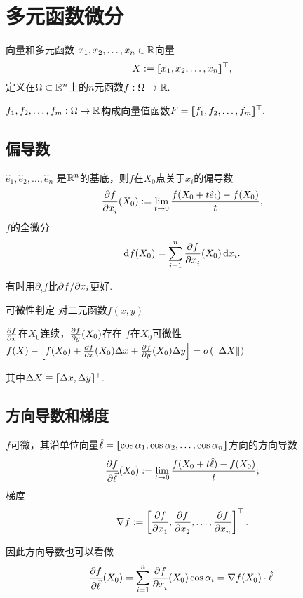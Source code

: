 \def\coursename{微积分}
\def\coursefullname{多元微积分与级数}
\def\courseEnglishname{Multivariate Calculus and Series}
\def\teachername{姚家燕}
\def\beginday{2021/3/31}





\firstandforemost

\section{多元函数微分}
\begin{definition}{向量和多元函数}{}
	$x_1,x_2,\ldots,x_n\in\mathbb R$向量
	\[
		X:=\lfloor\hspace{-4.7 pt}\lceil x_1,x_2,\ldots,x_n\rceil\hspace{-4.7 pt}\rfloor^\top,
	\]
	定义在$\Omega\subset\mathbb R^n$上的$n$元函数$f:\Omega\to\mathbb R.$
\end{definition}
$f_1,f_2,\ldots,f_m:\Omega\to\mathbb R$构成向量值函数$F=\lfloor\hspace{-4.7 pt}\lceil f_1,f_2,\ldots,f_m\rceil\hspace{-4.7 pt}\rfloor^\top.$
\subsection{偏导数}
\begin{definition}{}{}
	$\hat e_1,\hat e_2,\ldots,\hat e_n$ 是$\mathbb R^n$的基底，则$f$在$X_0$点关于$x_i$的偏导数
	\[
		\frac{\partial^{\;\!\!}f}{\partial x_i^{\;\!\!}}(X_0):=\lim_{t\to 0}\frac{f(X_0+t\hat e_i)-f(X_0)}t,
	\]
	$f$的全微分
	\begin{align}
		\mathop{}\!\mathrm{d} f(X_0)=\sum_{i=1}^n\frac{\partial^{\;\!\!}f}{\partial x_i^{\;\!\!}}(X_0)\mathop{}\!\mathrm{d} x_i.
	\end{align}
\end{definition}
有时用$\partial_if$比$\partial f/\partial x_i$更好.
\begin{theorem}{可微性判定}{}
	对二元函数$f(x,y)$
	\begin{center}
		$\frac{\partial^{\;\!\!}f}{\partial x^{\;\!\!}}$在$X_0$连续，$\frac{\partial^{\;\!\!}f}{\partial y^{\;\!\!}}(X_0)$存在
		\vthus
		$f$在$X_0$可微性
		\viff
		$f(X)-\fkh{f(X_0)+\pv fx(X_0)\Delta x+\pv fy(X_0)\Delta y}=o\kh{\norm{\Delta X}}$
	\end{center}
	其中$\Delta X\equiv\lfloor\hspace{-4.7 pt}\lceil \Delta x,\Delta y\rceil\hspace{-4.7 pt}\rfloor^\top.$
\end{theorem}
\subsection{方向导数和梯度}
\begin{definition}{}{}
	$f$可微，其沿单位向量$\hat \ell=\lfloor\hspace{-4.7 pt}\lceil \cos\alpha_1,\cos\alpha_2,\ldots,\cos\alpha_n\rceil\hspace{-4.7 pt}\rfloor$方向的方向导数 %
	\[
		\frac{\partial^{\;\!\!}f}{\partial \vec \ell^{\;\!\!}}(X_0):=\lim_{t\to 0}\frac{f(X_0+t\hat \ell)-f(X_0)}t;
	\]
	梯度
	\[
		\nabla f:=\left[\pv f{x_1},\pv f{x_2},\ldots,\pv f{x_n}\right]\tp.
	\]
\end{definition}
因此方向导数也可以看做
\begin{align}
	\pv f{\vec \ell}(X_0)=\sum_{i=1}^n\pv f{x_i}(X_0)\cos\alpha_i=\nabla f(X_0)\cdot\hat \ell.
\end{align}
